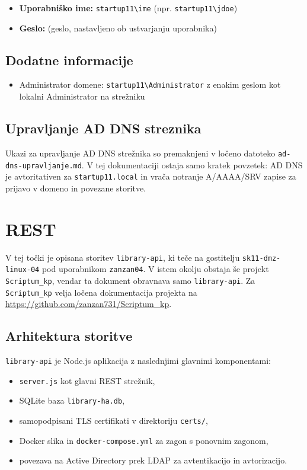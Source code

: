 \documentclass[a4paper,11pt]{article}
\begin{document}
\begin{itemize}
    \item \textbf{Uporabniško ime:} \texttt{startup11\textbackslash ime} (npr. \texttt{startup11\textbackslash jdoe})
    \item \textbf{Geslo:} (geslo, nastavljeno ob ustvarjanju uporabnika)
\end{itemize}

\subsection{Dodatne informacije}
\begin{itemize}
    \item Administrator domene: \texttt{startup11\textbackslash Administrator} z enakim geslom kot lokalni Administrator na strežniku
\end{itemize}

\subsection{Upravljanje AD DNS streznika}
Ukazi za upravljanje AD DNS strežnika so premaknjeni v ločeno datoteko \texttt{ad-dns-upravljanje.md}. V tej dokumentaciji ostaja samo kratek povzetek: AD DNS je avtoritativen za \texttt{startup11.local} in vrača notranje A/AAAA/SRV zapise za prijavo v domeno in povezane storitve.


\section{REST}
V tej točki je opisana storitev \texttt{library-api}, ki teče na gostitelju \texttt{sk11-dmz-linux-04} pod uporabnikom \texttt{zanzan04}. V istem okolju obstaja še projekt \texttt{Scriptum\_kp}, vendar ta dokument obravnava samo \texttt{library-api}. Za \texttt{Scriptum\_kp} velja ločena dokumentacija projekta na \url{https://github.com/zanzan731/Scriptum\_kp}.

\subsection{Arhitektura storitve}
\texttt{library-api} je Node.js aplikacija z naslednjimi glavnimi komponentami:
\begin{itemize}
  \item \texttt{server.js} kot glavni REST strežnik,
  \item SQLite baza \texttt{library-ha.db},
  \item samopodpisani TLS certifikati v direktoriju \texttt{certs/},
  \item Docker slika in \texttt{docker-compose.yml} za zagon s ponovnim zagonom,
  \item povezava na Active Directory prek LDAP za avtentikacijo in avtorizacijo.
\end{itemize}
\end{document}

